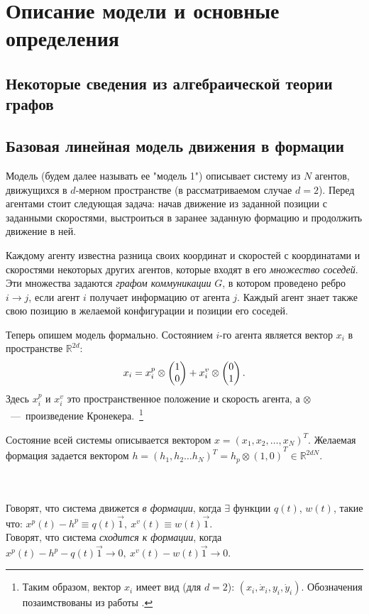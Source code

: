 \chapter{Описание модели и основные определения} \label{definitions}

\section{Некоторые сведения из алгебраической теории графов}
\section{Базовая линейная модель движения в формации}
Модель (будем далее называть ее "модель 1") описывает систему из $N$ агентов, движущихся в $d$-мерном пространстве (в рассматриваемом случае $d=2$). Перед агентами стоит следующая задача: начав движение из заданной позиции с заданными скоростями, выстроиться в заранее заданную формацию и продолжить движение в ней. 

Каждому агенту известна разница своих координат и скоростей с координатами и скоростями некоторых других агентов, которые входят в его \emph{множество соседей}. Эти множества задаются \emph{графом коммуникации} $G$, в котором проведено ребро $i\rightarrow j$, если агент $i$ получает информацию от агента $j$. Каждый агент знает также свою позицию в желаемой конфигурации и позиции его соседей.

Теперь опишем модель формально.
Состоянием $i$-го агента является  вектор $x_i$
в пространстве $\mathbb{R}^{2d}$:
$$x_i=x^p_i\otimes\veccol{1;0}+x^v_i\otimes
\veccol{0;1}.$$
Здесь $x^p_i$ и $x^v_i$ это пространственное положение и скорость агента, а $\otimes$\ ---\ произведение Кронекера.~\footnote{Таким образом, вектор $x_i$ имеет вид (для $d=2$): $\left(x_i, \dot{x}_i, y_i, \dot{y}_i\right)$. Обозначения позаимствованы из работы \cite{veerman2005flocks}.}

Состояние всей системы описывается вектором $x=\left(x_1,x_2,\ldots,x_N\right)^T$. Желаемая формация задается вектором 
$h={\left(h_1,h_2\ldots h_N\right)^T=h_p\otimes\left(1,0\right)}^T\in\mathbb{R}^{2dN}$.

\begin{definition}
\\\\
Говорят, что система движется \emph{в формации}, когда $\exists$ функции $q(t)$, $w(t)$, такие что:
$
x^p(t)-h^p\equiv q(t)\vec{1},\ x^v(t)\equiv w(t)\vec{1}.
$
\\
Говорят, что система \emph{сходится к формации}, когда
$
x^p(t)-h^p-q(t)\vec{1}\rightarrow 0,\ x^v(t)-w(t)\vec{1}\rightarrow 0.
$
\end{definition}

